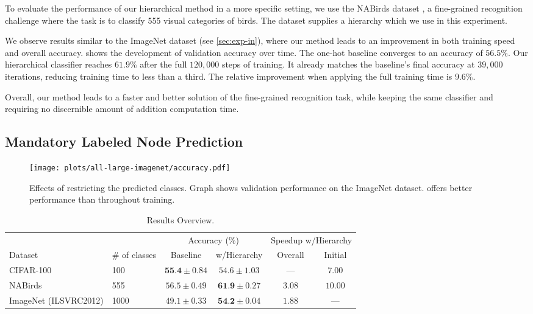 \documentclass[10pt,twocolumn,letterpaper]{article}
\begin{document}
To evaluate the performance of our hierarchical method in a more specific setting, we
use the NABirds dataset \cite{VanHorn2015NAB}, a fine-grained recognition challenge where
the task is to classify 555 visual categories of birds. The dataset supplies a hierarchy
which we use in this experiment.


We observe results similar to the ImageNet dataset (see \cref{sec:exp-in}), where
our method leads to an improvement in both training speed and overall accuracy.
 shows the development of validation accuracy over time.
The one-hot baseline converges to an accuracy of $56.5\%$. Our hierarchical
classifier reaches $61.9\%$ after the full $120,000$ steps of training. It already
matches the baseline's final accuracy at $39,000$ iterations, reducing training
time to less than a third. The relative improvement when applying the
full training time is $9.6\%$.

Overall, our method leads to a faster and better solution of the fine-grained recognition task,
while keeping the same classifier and requiring no discernible amount of addition computation time.

\subsection{Mandatory Labeled Node Prediction}
\label{sec:expmlnp}
\begin{figure}
\centering
\texttt{[image: plots/all-large-imagenet/accuracy.pdf]}
\caption{Effects of restricting the predicted classes. Graph shows validation performance on the ImageNet dataset.
   offers better performance than  throughout training.}
\label{fig:expmlnpgraph}
\end{figure}
\begin{table*}[t]
\centering
\caption{Results Overview.}
\label{tbl:expoverview}
\begin{tabular}{l|l||c|c||c|c}
 &  & \multicolumn{2}{c||}{Accuracy (\%)} & \multicolumn{2}{c}{Speedup w/Hierarchy}\\
Dataset       &  \# of classes  &     Baseline     &       w/Hierarchy        & Overall & Initial \\\hline
CIFAR-100     &  100     & $\textbf{55.4} \pm 0.84$ &  $54.6 \pm 1.03$ & ---            &  $7.00$\\
NABirds       &  555     & $56.5 \pm 0.49$ &  $\textbf{61.9} \pm 0.27$ & $3.08$ &  $10.00$\\
ImageNet (ILSVRC2012)  &  1000    & $49.1 \pm 0.33$  & $\textbf{54.2} \pm 0.04$ & $1.88$ & ---
\end{tabular} 
\end{table*}
\end{document}
